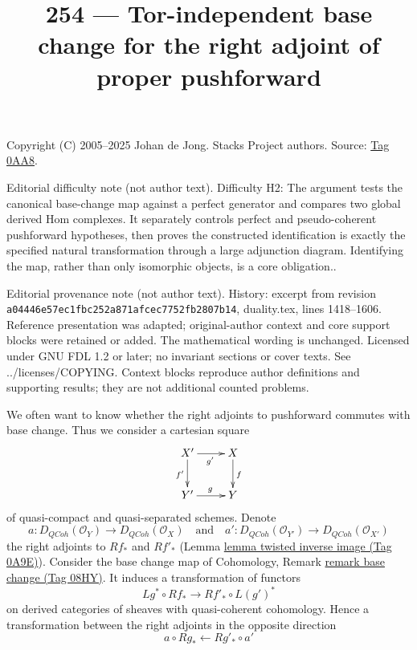 \documentclass{amsart}
\theoremstyle{plain}
\theoremstyle{definition}
\theoremstyle{remark}
\numberwithin{equation}{subsection}
\def\QCoh{\mathit{QCoh}}
\begin{document}
\title[Stacks Project, Tag 0AA8]{254 --- Tor-independent base change for the right adjoint of proper pushforward}
\maketitle
\noindent Copyright (C) 2005--2025 Johan de Jong. Stacks Project authors. Source: \href{https://stacks.math.columbia.edu/tag/0AA8}{Tag 0AA8}.

\noindent Editorial difficulty note (not author text). Difficulty H2: The argument tests the canonical base-change map against a perfect generator and compares two global derived Hom complexes. It separately controls perfect and pseudo-coherent pushforward hypotheses, then proves the constructed identification is exactly the specified natural transformation through a large adjunction diagram. Identifying the map, rather than only isomorphic objects, is a core obligation..

\noindent Editorial provenance note (not author text). History: excerpt from revision \texttt{a0444\allowbreak 6e57e\allowbreak c1fbc\allowbreak 252a8\allowbreak 71afc\allowbreak ec775\allowbreak 2fb28\allowbreak 07b14}, duality.tex, lines 1418--1606. Reference presentation was adapted; original-author context and core support blocks were retained or added. The mathematical wording is unchanged. Licensed under GNU FDL 1.2 or later; no invariant sections or cover texts. See ../licenses/COPYING. Context blocks reproduce author definitions and supporting results; they are not additional counted problems.

\medskip\noindent
We often want to know whether the right adjoints to pushforward commutes
with base change. Thus we consider a cartesian square
\begin{equation}
\label{equation-base-change}
\vcenter{
\xymatrix{
X' \ar[r]_{g'} \ar[d]_{f'} & X \ar[d]^f \\
Y' \ar[r]^g & Y
}
}
\end{equation}
of quasi-compact and quasi-separated schemes.
Denote
$$
a  : D_\QCoh(\mathcal{O}_Y) \to D_\QCoh(\mathcal{O}_X)
\quad\text{and}\quad
a'  : D_\QCoh(\mathcal{O}_{Y'}) \to D_\QCoh(\mathcal{O}_{X'})
$$
the right adjoints to $Rf_*$ and $Rf'_*$
(Lemma \href{https://stacks.math.columbia.edu/tag/0A9E}{lemma twisted inverse image (Tag 0A9E)}).
Consider the base change map of
Cohomology, Remark \href{https://stacks.math.columbia.edu/tag/08HY}{remark base change (Tag 08HY)}.
It induces a transformation of functors
$$
Lg^* \circ Rf_* \longrightarrow Rf'_* \circ L(g')^*
$$
on derived categories of sheaves with quasi-coherent cohomology.
Hence a transformation between the right adjoints in the opposite direction
$$
a \circ Rg_* \longleftarrow Rg'_* \circ a'
$$
\end{document}
